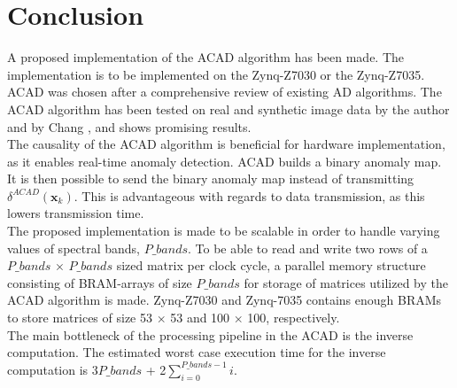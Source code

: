 \newpage
\chapter{Conclusion}
\label{sec:conclusion}



%
A proposed implementation of the ACAD algorithm has been made. The implementation is to be implemented on the Zynq-Z7030 or the Zynq-Z7035. ACAD was chosen after a comprehensive review of existing AD algorithms. The ACAD algorithm has been tested on real and synthetic image data by the author and by Chang \cite{chang2006characterization}, and shows promising results. \\

The causality of the ACAD algorithm is beneficial for hardware implementation, as it enables real-time anomaly detection. ACAD builds a binary anomaly map. It is then possible to send the binary anomaly map instead of transmitting $\delta^{ACAD}(\textbf{x}_{k})$. This is advantageous with regards to data transmission, as this lowers transmission time.  \\

The proposed implementation is made to be scalable in order to handle varying values of spectral bands, $P\_bands$. To be able to read and write two rows of a $P\_bands$ $\times$ $P\_bands$ sized matrix per clock cycle, a parallel memory structure consisting of BRAM-arrays of size $P\_bands$ for storage of matrices utilized by the ACAD algorithm is made. 
 Zynq-Z7030 and Zynq-7035 contains enough BRAMs to store matrices of size 53 $\times$ 53 and 100 $\times$ 100, respectively. \\

The main bottleneck of the processing pipeline in the ACAD is the inverse computation. The estimated worst case execution time for the inverse computation is 3$P\_bands$ + 2$\sum_{i=0}^{P\_bands-1}i$. 
\\


